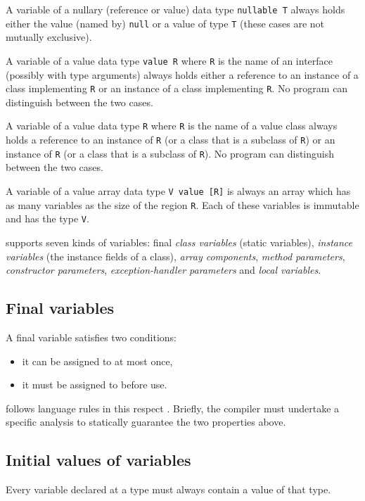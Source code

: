 A variable of a nullary (reference or value) data type {\tt nullable
T} always holds either the value (named by) {\tt null} or a value of
type {\tt T} (these cases are not mutually exclusive).

A variable of a value data type {\tt value R} where {\tt R} is the
name of an interface (possibly with type arguments) always holds
either a reference to an instance of a class implementing {\tt R} or
an instance of a class implementing {\tt R}. No program can
distinguish between the two cases.

A variable of a value data type {\tt R} where {\tt R} is the name of a
value class always holds a reference to an instance of {\tt R} (or a
class that is a subclass of {\tt R}) or an instance of {\tt R} (or a
class that is a subclass of {\tt R}). No program can distinguish
between the two cases.

A variable of a value array data type {\tt V value [R]} is always an
array which has as many variables as the size of the region {\tt R}.
Each of these variables is immutable and has the type {\tt V}.

\Xten{} supports seven kinds of variables: final {\em class
variables} (static variables), {\em instance variables} (the instance
fields of a class), {\em array components}, {\em method parameters},
{\em constructor parameters}, {\em exception-handler parameters} and
{\em local variables}.

\subsection{Final variables}\label{FinalVariable}
A final variable satisfies two conditions: 
\begin{itemize}
\item it can be assigned to at most once, 
\item it must be assigned to before use. 
\end{itemize}

\Xten{} follows \java{} language rules in this respect \cite[\S
4.5.4,8.3.1.2,16]{jls2}. Briefly, the compiler must undertake a
specific analysis to statically guarantee the two properties above.


\subsection{Initial values of variables}
\label{NullaryConstructor}
\cbstart 
Every variable declared at a type must always contain a value of that type.

